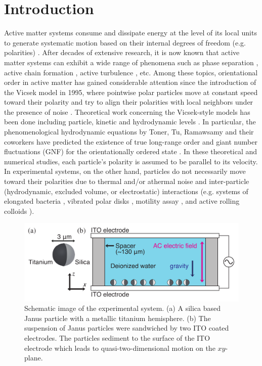 \documentclass[%
 reprint,
 amsmath,amssymb,
 aps,
 floatfix
]{revtex4-2}
\begin{document}
\section{Introduction}
Active matter systems consume and dissipate energy at the level of its local units to generate systematic motion based on their internal degrees of freedom (e.g. polarities) \cite{ramaswamy2010,marchetti2013,ramaswamy2017,chate2020}.
After decades of extensive research, it is now known that active matter systems can exhibit a wide range of phenomena such as phase separation \cite{tailleur2008, theurkauff2012,palacci2013,linden2019}, active chain formation \cite{nishiguchi2018a,harder2018}, 
active turbulence \cite{zhang2010,wu2017,nishiguchi2018b,nishiguchi2020}, etc.
Among these topics, orientational order in active matter has gained considerable attention since the introduction of the Vicsek model in 1995, where pointwise polar particles move at constant speed toward their polarity and try to align their polarities with local neighbors under the presence of noise \cite{vicsek1995}.
Theoretical work concerning the Vicsek-style models has been done including particle, kinetic and hydrodynamic levels \cite{tonertu95, tonertu98, ramaswamy2003,chate2004,bertin2006,chate2008,bertin2009,toner2012,benoit2019}.
In particular, the phenomenological hydrodynamic equations by Toner, Tu, Ramawsamy and their coworkers have predicted the existence of true long-range order and giant number fluctuations (GNF) for the orientationally ordered state \cite{tonertu95,tonertu98,ramaswamy2003,toner2005,toner2012}.
In these theoretical and numerical studies, each particle's polarity is assumed to be parallel to its velocity.
In experimental systems, on the other hand, particles do not necessarily move toward their polarities due to thermal and/or athermal noise and inter-particle (hydrodynamic, excluded volume, or electrostatic) interactions (e.g. systems of elongated bacteria \cite{nishiguchi2017}, vibrated polar disks \cite{dauchot2013}, motility assay \cite{tanida2020}, and active rolling colloids \cite{bricard2013,bartolo2018}). 

\begin{figure}[tb]
\includegraphics[width=\columnwidth]{schematic.pdf}
\caption{\label{schematic}Schematic image of the experimental system. (a) A silica based Janus particle with a metallic titanium hemisphere. (b) The suspension of Janus particles were sandwiched by two ITO coated electrodes. The particles sediment to the surface of the ITO electrode which leads to quasi-two-dimensional motion on the $xy$-plane.}
\end{figure} 
\end{document}

